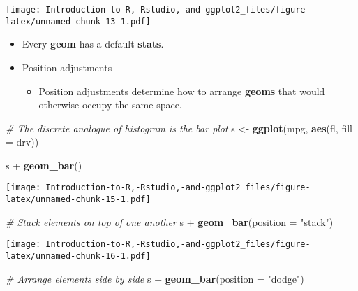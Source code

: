 \documentclass[]{book}
\newenvironment{Shaded}{\begin{snugshade}}{\end{snugshade}}
\newcommand{\KeywordTok}[1]{\textcolor[rgb]{0.13,0.29,0.53}{\textbf{{#1}}}}
\newcommand{\DataTypeTok}[1]{\textcolor[rgb]{0.13,0.29,0.53}{{#1}}}
\newcommand{\StringTok}[1]{\textcolor[rgb]{0.31,0.60,0.02}{{#1}}}
\newcommand{\CommentTok}[1]{\textcolor[rgb]{0.56,0.35,0.01}{\textit{{#1}}}}
\newcommand{\NormalTok}[1]{{#1}}
\providecommand{\tightlist}{%
  \setlength{\itemsep}{0pt}\setlength{\parskip}{0pt}}
\begin{document}
\texttt{[image: Introduction-to-R,-Rstudio,-and-ggplot2\_files/figure-latex/unnamed-chunk-13-1.pdf]}

\begin{itemize}
\item
  Every \textbf{geom} has a default \textbf{stats}.
\item
  Position adjustments

  \begin{itemize}
  \tightlist
  \item
    Position adjustments determine how to arrange \textbf{geoms} that
    would otherwise occupy the same space.
  \end{itemize}
\end{itemize}

\begin{Shaded}
\begin{Highlighting}[]
\CommentTok{# The discrete analogue of histogram is the bar plot}
\NormalTok{s <-}\StringTok{ }\KeywordTok{ggplot}\NormalTok{(mpg, }\KeywordTok{aes}\NormalTok{(fl, }\DataTypeTok{fill =} \NormalTok{drv))}
\end{Highlighting}
\end{Shaded}

\begin{Shaded}
\begin{Highlighting}[]
\NormalTok{s +}\StringTok{ }\KeywordTok{geom_bar}\NormalTok{()}
\end{Highlighting}
\end{Shaded}

\texttt{[image: Introduction-to-R,-Rstudio,-and-ggplot2\_files/figure-latex/unnamed-chunk-15-1.pdf]}

\begin{Shaded}
\begin{Highlighting}[]
\CommentTok{# Stack elements on top of one another}
\NormalTok{s +}\StringTok{ }\KeywordTok{geom_bar}\NormalTok{(}\DataTypeTok{position =} \StringTok{"stack"}\NormalTok{)}
\end{Highlighting}
\end{Shaded}

\texttt{[image: Introduction-to-R,-Rstudio,-and-ggplot2\_files/figure-latex/unnamed-chunk-16-1.pdf]}

\begin{Shaded}
\begin{Highlighting}[]
\CommentTok{# Arrange elements side by side}
\NormalTok{s +}\StringTok{ }\KeywordTok{geom_bar}\NormalTok{(}\DataTypeTok{position =} \StringTok{"dodge"}\NormalTok{)}
\end{Highlighting}
\end{Shaded}
\end{document}
